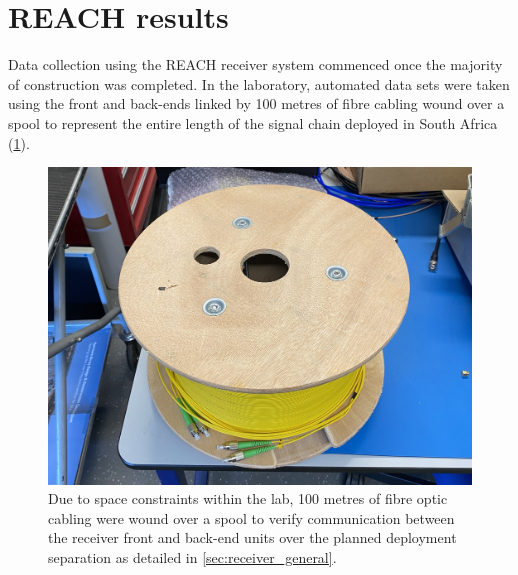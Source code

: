 \section{REACH results}\label{sec:reach_results}
Data collection using the REACH receiver system commenced once the majority of construction was completed. In the laboratory, automated data sets were taken using the front and back-ends linked by 100 metres of fibre cabling wound over a spool to represent the entire length of the signal chain deployed in South Africa (\cref{fig:fibre_spool}).
\begin{figure}
    \centering
    \includegraphics[width=.6\textwidth]{fibre_spool.jpg}
    \caption{Due to space constraints within the lab, 100 metres of fibre optic cabling were wound over a spool to verify communication between the receiver front and back-end units over the planned deployment separation as detailed in \cref{sec:receiver_general}.}
    \label{fig:fibre_spool}
\end{figure}

